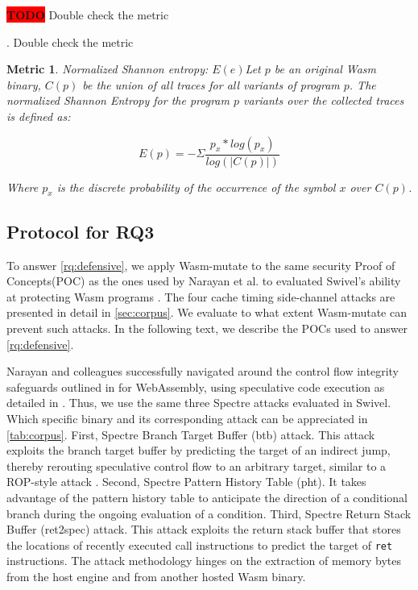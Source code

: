 \documentclass[sigplan,screen]{acmart}
\newcommand*\badge[1]{ \colorbox{red}{\color{white}#1}}
\newcommand{\tool}{Wasm-mutate\xspace}
\newcommand{\wasm}{Wasm\xspace}
\newcommand{\Wasm}{WebAssembly\xspace}
\newtheorem{metric}{Metric}
\newcommand{\todo}[1]{%
\refstepcounter{todo}
\noindent\textbf{\badge{TODO}} {\color{red}#1}
\addcontentsline{td}{todo}
{\color{red}\thesection.\thetodo\xspace #1}}
\begin{document}
\todo{Double check the metric}

\begin{metric}{Normalized Shannon entropy: $E(e)$}\label{metric:entropy}
    Let $p$ be an original \wasm binary, $C(p)$ be the union  of all traces for all variants of program $p$.
    The normalized Shannon Entropy for the program  $p$ variants over the collected traces is defined as: \\
    {
    \scriptsize
        $$
            E(p)=-\Sigma \frac{p_x*log(p_x)}{log(|C(p)|)}
        $$
    
    }
    Where $p_x$ is the discrete probability of the occurrence of the symbol $x$ over $C(p)$.


    
\end{metric}



\subsection{Protocol for RQ3}
\label{protocol:rq3}

\newcommand{\poct}{\emph{Cache timing POC}\xspace}
\newcommand{\pocd}{\emph{Differential computing POC}\xspace}
\newcommand{\pocp}{\emph{Port contention POC}\xspace}

To answer \ref{rq:defensive}, we apply \tool to the same security Proof of Concepts(POC) 
as the ones used by Narayan et al. to evaluated Swivel's ability at protecting \wasm programs \cite{Swivel}. 
The four cache timing side-channel attacks are presented in detail in \autoref{sec:corpus}. 
We evaluate to what extent \tool can prevent such attacks.
In the following text, we describe the POCs used to answer \ref{rq:defensive}.


Narayan and colleagues successfully navigated around the control flow integrity safeguards outlined in \cite{Swivel} for \Wasm, using speculative code execution as detailed in \cite{Spectre}. 
Thus, we use the same three Spectre attacks evaluated in Swivel.
Which specific binary and its corresponding attack can be appreciated in \autoref{tab:corpus}.
First, Spectre Branch Target Buffer (btb) attack. 
This attack exploits the branch target buffer by predicting the target of an indirect jump, thereby rerouting speculative control flow to an arbitrary target, similar to a ROP-style attack \cite{?}.
Second, Spectre Pattern History Table (pht).
It takes advantage of the pattern history table to anticipate the direction of a conditional branch during the ongoing evaluation of a condition. 
Third, Spectre Return Stack Buffer (ret2spec) attack. 
This attack exploits the return stack buffer that stores the locations of recently executed call instructions to predict the target of \texttt{ret} instructions. 
The attack methodology hinges on the extraction of memory bytes from the host engine and from another hosted \wasm binary.
\end{document}

